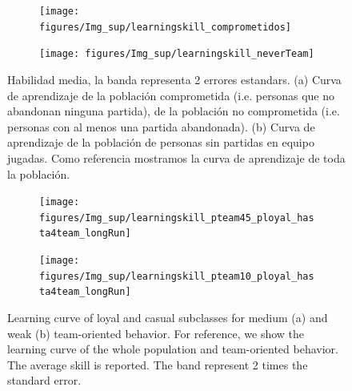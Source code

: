 \documentclass[a4paper,11pt]{book}
\theoremstyle{definition}
\begin{document}
\begin{figure}[H]
\centering
  \begin{subfigure}[b]{0.49\textwidth}
  \texttt{[image: figures/Img\_sup/learningskill\_comprometidos]}
  \caption{}
  \label{learningskill_comprometidos}
  \end{subfigure}
  \begin{subfigure}[b]{0.49\textwidth}
   \texttt{[image: figures/Img\_sup/learningskill\_neverTeam]}
   \label{learningskill_neverTeam}
  \end{subfigure}
  \caption{Habilidad media, la banda representa 2 errores estandars.
  (a) Curva de aprendizaje de la población comprometida (i.e. personas que no abandonan ninguna partida), de la población no comprometida (i.e. personas con al menos una partida abandonada).
  (b) Curva de aprendizaje de la población de personas sin partidas en equipo jugadas.
  Como referencia mostramos la curva de aprendizaje de toda la población.}
\end{figure}




\begin{figure}[H]
  \centering
  \begin{subfigure}[b]{0.49\textwidth}
  \texttt{[image: figures/Img\_sup/learningskill\_pteam45\_ployal\_hasta4team\_longRun]}
  \label{learningskill_pteam45_ployal_hasta4team_longRun}
   \end{subfigure}
  \begin{subfigure}[b]{0.49\textwidth}
  \texttt{[image: figures/Img\_sup/learningskill\_pteam10\_ployal\_hasta4team\_longRun]}
  \label{learningskill_pteam10_ployal_hasta4team_longRun}
  \end{subfigure}
  \caption{Learning curve of loyal and casual subclasses for medium (a) and weak (b) team-oriented behavior. For reference, we show the learning curve of the whole population and team-oriented behavior. The average skill is reported. The band represent 2 times the standard error.}
    \label{learning_curve_ployal_hasta4team_longRun}
\end{figure}
\end{document}

